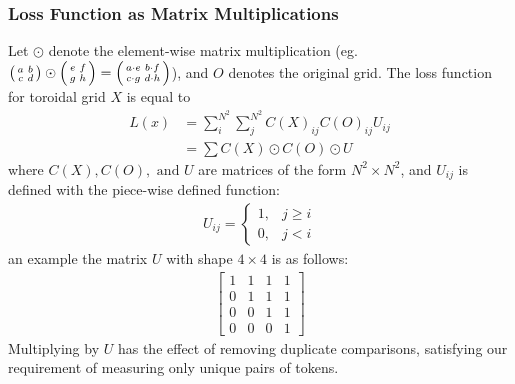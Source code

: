 \subsubsection{Loss Function as Matrix Multiplications}%
\label{ssub:loss_function_as_matrix_multiplications}
Let $\odot$ denote the element-wise matrix multiplication
(eg.~$
\begin{psmallmatrix}
    a&b\\
    c&d
\end{psmallmatrix}\odot
\begin{psmallmatrix}
    e&f\\
    g&h
\end{psmallmatrix}=
\begin{psmallmatrix}
    a\cdot e&b\cdot f\\
    c\cdot g&d\cdot h
\end{psmallmatrix}
$), and $O$ denotes the original grid. The loss function for toroidal grid $X$ is equal to
\begin{align*}
    L(x)&=\sum_i^{N^2}\sum_j^{N^2}C(X)_{ij}C(O)_{ij}U_{ij}\\
        &=\sum C(X)\odot C(O)\odot U
\end{align*}
where $C(X),C(O),\text{ and }U$ are matrices of the form $N^2\times N^2$, and $U_{ij}$ is defined with the piece-wise defined function:
\begin{align*}
    U_{ij}=
    \begin{cases}
        1, & j\geq i \\
        0, & j<i
    \end{cases}
\end{align*}
an example the matrix $U$ with shape $4\times 4$ is as follows:
 \begin{align*}
    \begin{bmatrix}
        1&1&1&1\\
        0&1&1&1\\
        0&0&1&1\\
        0&0&0&1
    \end{bmatrix}
\end{align*}
Multiplying by $U$ has the effect of removing duplicate comparisons, satisfying our requirement of measuring only unique pairs of tokens.
